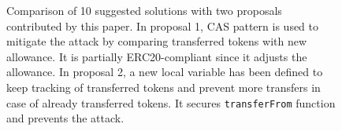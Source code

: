\begin{figure}[h]
	\caption{Comparison of 10 suggested solutions with two proposals contributed by this paper. In proposal 1, CAS pattern is used to mitigate the attack by comparing transferred tokens with new allowance. It is partially ERC20-compliant since it adjusts the allowance. In proposal 2, a new local variable has been defined to keep tracking of transferred tokens and prevent more transfers in case of already transferred tokens. It secures \texttt{transferFrom} function and prevents the attack.\label{tab:comp}}
\end{figure}
